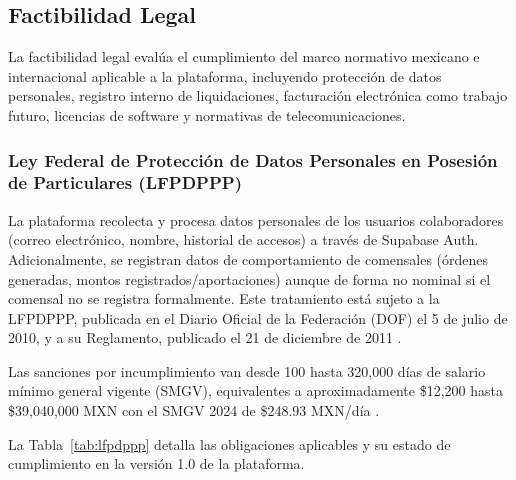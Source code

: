 \FloatBarrier
\subsection{Factibilidad Legal}

La factibilidad legal evalúa el cumplimiento del marco normativo mexicano e
internacional aplicable a la plataforma, incluyendo protección de datos personales,
registro interno de liquidaciones, facturación electrónica como trabajo futuro,
licencias de software y normativas de telecomunicaciones.

\subsubsection{Ley Federal de Protección de Datos Personales en Posesión de
Particulares (LFPDPPP)}

La plataforma recolecta y procesa datos personales de los usuarios colaboradores
(correo electrónico, nombre, historial de accesos) a través de Supabase Auth.
Adicionalmente, se registran datos de comportamiento de comensales (órdenes
generadas, montos registrados/aportaciones) aunque de forma no nominal si el comensal no se
registra formalmente. Este tratamiento está sujeto a la LFPDPPP, publicada en
el Diario Oficial de la Federación (DOF) el 5 de julio de 2010, y a su Reglamento,
publicado el 21 de diciembre de 2011 \cite{lfpdppp}.

Las sanciones por incumplimiento van desde 100 hasta 320,000 días de salario
mínimo general vigente (SMGV), equivalentes a aproximadamente \$12,200 hasta
\$39,040,000 MXN con el SMGV 2024 de \$248.93 MXN/día \cite{reglamento_lfpdppp}.

La Tabla~\ref{tab:lfpdppp} detalla las obligaciones aplicables y su estado de
cumplimiento en la versión 1.0 de la plataforma.

